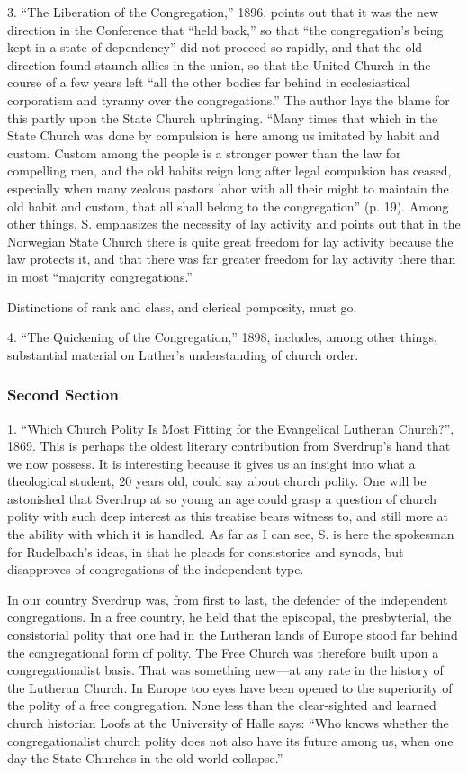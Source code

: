 3. “The Liberation of the Congregation,” 1896, points out that it was the new direction in the Conference that “held back,” so that “the congregation’s being kept in a state of dependency” did not proceed so rapidly, and that the old direction found staunch allies in the union, so that the United Church in the course of a few years left “all the other bodies far behind in ecclesiastical corporatism and tyranny over the congregations.” The author lays the blame for this partly upon the State Church upbringing. “Many times that which in the State Church was done by compulsion is here among us imitated by habit and custom. Custom among the people is a stronger power than the law for compelling men, and the old habits reign long after legal compulsion has ceased, especially when many zealous pastors labor with all their might to maintain the old habit and custom, that all shall belong to the congregation” (p. 19). Among other things, S. emphasizes the necessity of lay activity and points out that in the Norwegian State Church there is quite great freedom for lay activity because the law protects it, and that there was far greater freedom for lay activity there than in most “majority congregations.”

Distinctions of rank and class, and clerical pomposity, must go.

4. “The Quickening of the Congregation,” 1898, includes, among other things, substantial material on Luther’s understanding of church order.

\subsubsection{Second Section}

1. “Which Church Polity Is Most Fitting for the Evangelical Lutheran Church?”, 1869. This is perhaps the oldest literary contribution from Sverdrup’s hand that we now possess. It is interesting because it gives us an insight into what a theological student, 20 years old, could say about church polity. One will be astonished that Sverdrup at so young an age could grasp a question of church polity with such deep interest as this treatise bears witness to, and still more at the ability with which it is handled. As far as I can see, S. is here the spokesman for Rudelbach’s ideas, in that he pleads for consistories and synods, but disapproves of congregations of the independent type.

In our country Sverdrup was, from first to last, the defender of the independent congregations. In a free country, he held that the episcopal, the presbyterial, the consistorial polity that one had in the Lutheran lands of Europe stood far behind the congregational form of polity. The Free Church was therefore built upon a congregationalist basis. That was something new—at any rate in the history of the Lutheran Church. In Europe too eyes have been opened to the superiority of the polity of a free congregation. None less than the clear-sighted and learned church historian Loofs at the University of Halle says: “Who knows whether the congregationalist church polity does not also have its future among us, when one day the State Churches in the old world collapse.”

